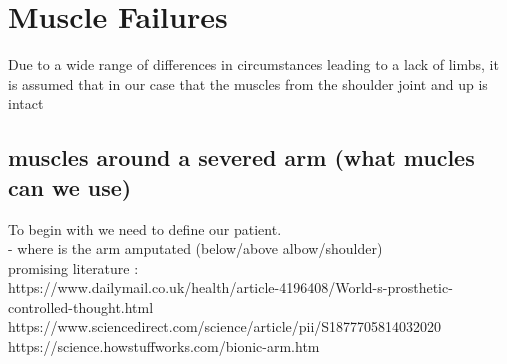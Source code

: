 \section{Muscle Failures}
Due to a wide range of differences in circumstances leading to a lack of limbs, it is assumed that in our case that the muscles from the shoulder joint and up is intact 


\subsection{muscles around a severed arm (what mucles can we use)}
    To begin with we need to define our patient.\\
    -   where is the arm amputated (below/above albow/shoulder)\\
    promising literature : \\
    https://www.dailymail.co.uk/health/article-4196408/World-s-prosthetic-controlled-thought.html\\
    https://www.sciencedirect.com/science/article/pii/S1877705814032020\\
    https://science.howstuffworks.com/bionic-arm.htm\\
    